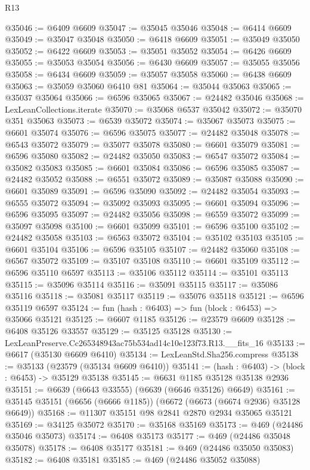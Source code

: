 \begin{lexlean}{R13}
\begin{coremodule}
@35046 := @6409 @6609
@35047 := @35045 @35046
@35048 := @6414 @6609
@35049 := @35047 @35048
@35050 := @6418 @6609
@35051 := @35049 @35050
@35052 := @6422 @6609
@35053 := @35051 @35052
@35054 := @6426 @6609
@35055 := @35053 @35054
@35056 := @6430 @6609
@35057 := @35055 @35056
@35058 := @6434 @6609
@35059 := @35057 @35058
@35060 := @6438 @6609
@35063 := @35059 @35060 @6410 @81
@35064 := @35044 @35063
@35065 := @35037 @35064
@35066 := @6596 @35065
@35067 := @24482 @35046
@35068 := LexLeanCollections.iterate
@35070 := @35068 @6537 @35042
@35072 := @35070 @351 @35063
@35073 := @6539 @35072
@35074 := @35067 @35073
@35075 := @6601 @35074
@35076 := @6596 @35075
@35077 := @24482 @35048
@35078 := @6543 @35072
@35079 := @35077 @35078
@35080 := @6601 @35079
@35081 := @6596 @35080
@35082 := @24482 @35050
@35083 := @6547 @35072
@35084 := @35082 @35083
@35085 := @6601 @35084
@35086 := @6596 @35085
@35087 := @24482 @35052
@35088 := @6551 @35072
@35089 := @35087 @35088
@35090 := @6601 @35089
@35091 := @6596 @35090
@35092 := @24482 @35054
@35093 := @6555 @35072
@35094 := @35092 @35093
@35095 := @6601 @35094
@35096 := @6596 @35095
@35097 := @24482 @35056
@35098 := @6559 @35072
@35099 := @35097 @35098
@35100 := @6601 @35099
@35101 := @6596 @35100
@35102 := @24482 @35058
@35103 := @6563 @35072
@35104 := @35102 @35103
@35105 := @6601 @35104
@35106 := @6596 @35105
@35107 := @24482 @35060
@35108 := @6567 @35072
@35109 := @35107 @35108
@35110 := @6601 @35109
@35112 := @6596 @35110 @6597
@35113 := @35106 @35112
@35114 := @35101 @35113
@35115 := @35096 @35114
@35116 := @35091 @35115
@35117 := @35086 @35116
@35118 := @35081 @35117
@35119 := @35076 @35118
@35121 := @6596 @35119 @6597
@35124 := fun (hash : @6403) => fun (block : @6453) => @35066 @35121
@35125 := @6607 @1185
@35126 := @23579 @6609
@35128 := @6408 @35126 @33557
@35129 := @35125 @35128
@35130 := LexLeanPreserve.Cc265348943ac75b534ad14c10e123f73.R13.__fits_16
@35133 := @6617 (@35130 @6609 @6410)
@35134 := LexLeanStd.Sha256.compress
@35138 := @35133 (@23579 (@35134 @6609 @6410))
@35141 := (hash : @6403) -> (block : @6453) -> @35129 @35138
@35145 := @6631 @1185 @35128 @35138 @2936
@35151 := @6639 (@6643 @33555) (@6639 (@6646 @35126) @6649)
@35161 := @35145 @35151 (@6656 (@6666 @1185)) (@6672 (@6673 (@6674 @2936) @35128 @6649))
@35168 := @11307 @35151 @98 @2841 @2870 @2934 @35065 @35121
@35169 := @34125 @35072
@35170 := @35168 @35169
@35173 := @469 (@24486 @35046 @35073)
@35174 := @6408 @35173
@35177 := @469 (@24486 @35048 @35078)
@35178 := @6408 @35177
@35181 := @469 (@24486 @35050 @35083)
@35182 := @6408 @35181
@35185 := @469 (@24486 @35052 @35088)

\end{coremodule}
\end{lexlean}
